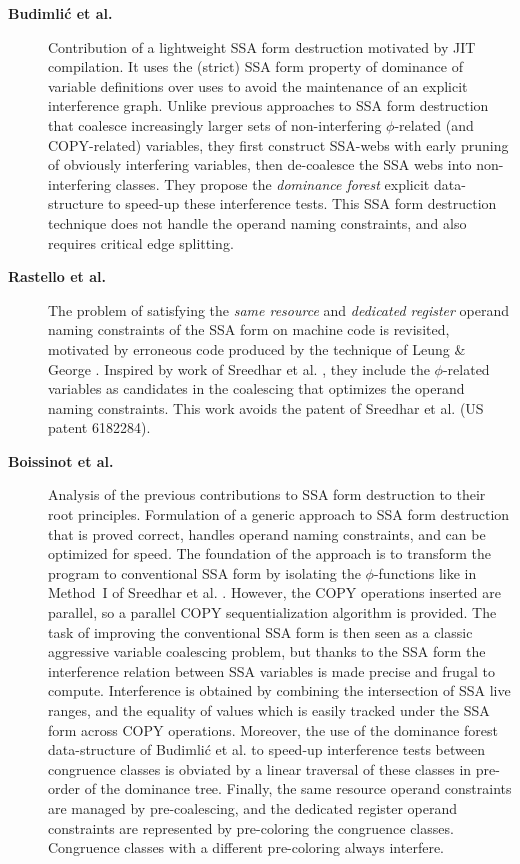 \begin{description}
\item[\textbf{Budimli\'c et al. \cite{Budimlic:2002:PLDI}}] Contribution of a lightweight SSA form
destruction motivated by JIT compilation. It uses the (strict) SSA form property
of dominance of variable definitions over uses to avoid the maintenance of an
explicit interference graph. Unlike previous approaches to SSA form destruction
that coalesce increasingly larger sets of non-interfering $\phi$-related (and
COPY-related) variables, they first construct SSA-webs with early pruning of
obviously interfering variables, then de-coalesce the SSA webs into
non-interfering classes.  They propose the \emph{dominance forest} explicit
data-structure to speed-up these interference tests. This SSA form destruction
technique does not handle the operand naming constraints, and also requires
critical edge splitting.

\item[\textbf{Rastello et al. \cite{Rastello:2004:CGO}}] The problem of
satisfying the \emph{same resource} and \emph{dedicated register} operand naming
constraints of the SSA form on machine code is revisited, motivated by erroneous code
produced by the technique of Leung \& George \cite{Leung:1999:PLDI}. Inspired by
work of Sreedhar et al.  \cite{Sreedhar:1999:SAS}, they include the
$\phi$-related variables as candidates in the coalescing that optimizes the
operand naming constraints.  This work avoids the patent of Sreedhar et al. (US
patent 6182284).


\item[\textbf{Boissinot et al. \cite{Boissinot:2009:CGO}}] Analysis of the previous
contributions to SSA form destruction to their root principles. Formulation
of a generic approach to SSA form destruction that is proved correct, handles
operand naming constraints, and can be optimized for speed. The foundation of
the approach is to transform the program to conventional SSA form by isolating
the $\phi$-functions like in Method~I of Sreedhar et al.
\cite{Sreedhar:1999:SAS}.  However, the COPY operations inserted are parallel,
so a parallel COPY sequentialization algorithm is provided. The task of
improving the conventional SSA form is then seen as a classic aggressive
variable coalescing problem, but thanks to the SSA form the
interference relation between SSA variables is made precise and frugal to
compute.  Interference is obtained by combining the intersection of SSA live
ranges, and the equality of values which is easily tracked under the SSA form
across COPY operations. Moreover, the use of the dominance forest data-structure
of Budimli\'c et al.  \cite{Budimlic:2002:PLDI} to speed-up interference tests
between congruence classes is obviated by a linear traversal of these classes in
pre-order of the dominance tree. Finally, the same resource operand constraints
are managed by pre-coalescing, and the dedicated register operand constraints
are represented by pre-coloring the congruence classes. Congruence classes with
a different pre-coloring always interfere.

\end{description}

